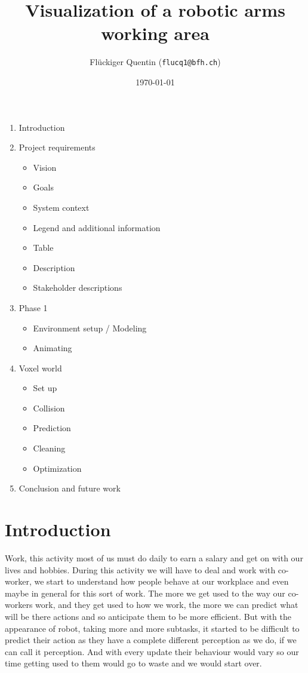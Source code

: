 \documentclass{scrartcl}
\begin{document}
\title{Visualization of a robotic arms working area}
\date{\today}   %
\author{Flückiger Quentin (\texttt{flucq1@bfh.ch}) }

\clearpage
\maketitle
\tableofcontents
\begin{enumerate}
  \item Introduction
  \item Project requirements
  \begin{itemize}
    \item Vision
    \item Goals
    \item System context
    \item Legend and additional information
    \item Table
    \item Description
    \item Stakeholder descriptions
  \end{itemize}
  \item Phase 1
  \begin{itemize}
    \item Environment setup / Modeling
    \item Animating
  \end{itemize}
  \item Voxel world
  \begin{itemize}
    \item Set up
    \item Collision
    \item Prediction
    \item Cleaning
    \item Optimization
  \end{itemize}
  \item Conclusion and future work
\end{enumerate}

\clearpage

\section{Introduction}

Work, this activity most of us must do daily to earn a salary and get on with our lives and hobbies.
During this activity we will have to deal and work with co-worker, we start to understand how people behave at our workplace 
and even maybe in general for this sort of work. The more we get used to the way our co-workers work,
and they get used to how we work, the more we can predict what will be there actions and so anticipate them to be more efficient.
But with the appearance of robot, taking more and more subtasks, it started to be difficult to predict their action 
as they have a complete different perception as we do, if we can call it perception. 
And with every update their behaviour would vary so our time getting used to them would go to waste and we would start over. 
\end{document}
